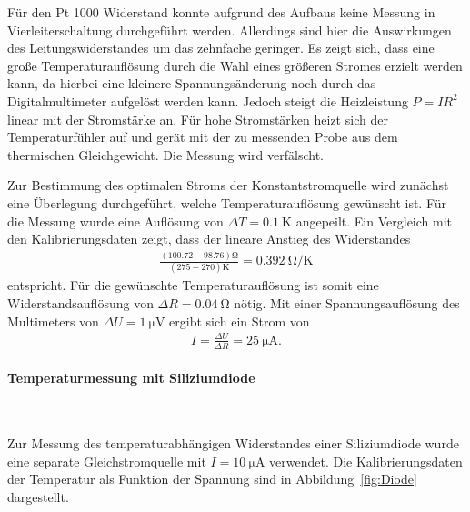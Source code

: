 \documentclass[parskip=half, a4paper,twoside,final]{article}
\begin{document}


Für den Pt 1000 Widerstand konnte aufgrund des Aufbaus keine Messung in Vierleiterschaltung durchgeführt werden. Allerdings sind hier die Auswirkungen des Leitungswiderstandes um das zehnfache geringer. Es zeigt sich, dass eine große Temperaturauflösung durch die Wahl eines größeren Stromes erzielt werden kann, da hierbei eine kleinere Spannungsänderung noch durch das Digitalmultimeter aufgelöst werden kann. Jedoch steigt die Heizleistung $P = I R^2$ linear mit der Stromstärke an. Für hohe Stromstärken heizt sich der Temperaturfühler auf und gerät mit der zu messenden Probe aus dem thermischen Gleichgewicht. Die Messung wird verfälscht.

Zur Bestimmung des optimalen Stroms der Konstantstromquelle wird zunächst eine Überlegung durchgeführt, welche Temperaturauflösung gewünscht ist. Für die Messung wurde eine Auflösung von $\Delta T = \SI{0.1}{\kelvin}$ angepeilt. Ein Vergleich mit den Kalibrierungsdaten zeigt, dass der lineare Anstieg des Widerstandes
\begin{align}
  \frac{(100.72-98.76)\si{\ohm}}{(275-270)\si{\kelvin}} = \SI{0.392}{\ohm\per\kelvin}
\end{align}
entspricht. Für die gewünschte Temperaturauflösung ist somit eine Widerstandsauflösung von $\Delta R = \SI{0.04}{\ohm}$ nötig. Mit einer Spannungsauflösung des Multimeters von $\Delta U = \SI{1}{\micro\volt}$ ergibt sich ein Strom von
\begin{align}
  I = \frac{\Delta U}{\Delta R} = \SI{25}{\micro\ampere}.
\end{align}

\paragraph{Temperaturmessung mit Siliziumdiode}$~$

Zur Messung des temperaturabhängigen Widerstandes einer Siliziumdiode wurde eine separate Gleichstromquelle mit $I = \SI{10}{\micro\ampere}$ verwendet. Die Kalibrierungsdaten der Temperatur als Funktion der Spannung sind in Abbildung~\ref{fig:Diode} dargestellt.


\end{document}
